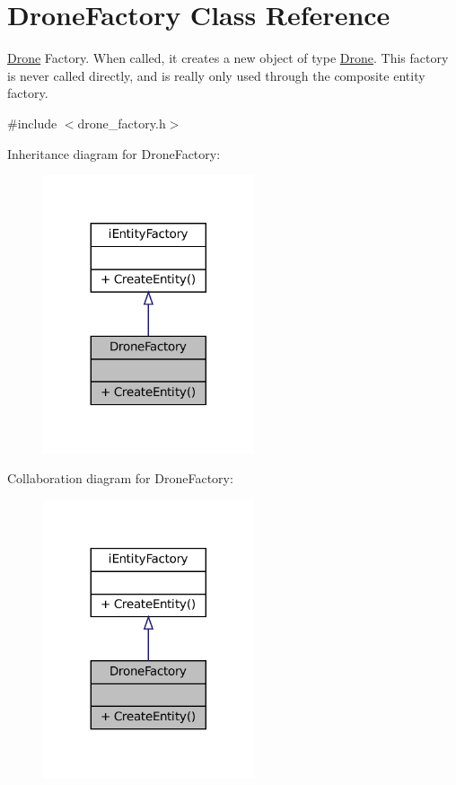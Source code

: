 \hypertarget{classDroneFactory}{}\section{Drone\+Factory Class Reference}
\label{classDroneFactory}


\hyperlink{classDrone}{Drone} Factory. When called, it creates a new object of type \hyperlink{classDrone}{Drone}. This factory is never called directly, and is really only used through the composite entity factory.  




{\ttfamily \#include $<$drone\+\_\+factory.\+h$>$}



Inheritance diagram for Drone\+Factory\+:\nopagebreak
\begin{figure}[H]
\begin{center}
\leavevmode
\includegraphics[width=176pt]{classDroneFactory__inherit__graph}
\end{center}
\end{figure}


Collaboration diagram for Drone\+Factory\+:\nopagebreak
\begin{figure}[H]
\begin{center}
\leavevmode
\includegraphics[width=176pt]{classDroneFactory__coll__graph}
\end{center}
\end{figure}
